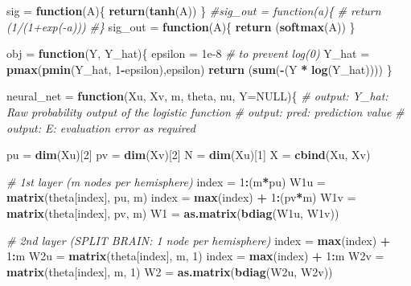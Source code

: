 \documentclass[12pt,halfline,a4paper,]{ouparticle}
\newenvironment{Shaded}{\begin{snugshade}}{\end{snugshade}}
\newcommand{\AttributeTok}[1]{\textcolor[rgb]{0.13,0.29,0.53}{#1}}
\newcommand{\CommentTok}[1]{\textcolor[rgb]{0.56,0.35,0.01}{\textit{#1}}}
\newcommand{\ConstantTok}[1]{\textcolor[rgb]{0.56,0.35,0.01}{#1}}
\newcommand{\ControlFlowTok}[1]{\textcolor[rgb]{0.13,0.29,0.53}{\textbf{#1}}}
\newcommand{\DecValTok}[1]{\textcolor[rgb]{0.00,0.00,0.81}{#1}}
\newcommand{\FloatTok}[1]{\textcolor[rgb]{0.00,0.00,0.81}{#1}}
\newcommand{\FunctionTok}[1]{\textcolor[rgb]{0.13,0.29,0.53}{\textbf{#1}}}
\newcommand{\NormalTok}[1]{#1}
\newcommand{\OtherTok}[1]{\textcolor[rgb]{0.56,0.35,0.01}{#1}}
\newcommand{\SpecialCharTok}[1]{\textcolor[rgb]{0.81,0.36,0.00}{\textbf{#1}}}
\begin{document}
\begin{Shaded}
\begin{Highlighting}[]
\NormalTok{sig }\OtherTok{=} \ControlFlowTok{function}\NormalTok{(A)\{}
  \FunctionTok{return}\NormalTok{(}\FunctionTok{tanh}\NormalTok{(A))}
\NormalTok{\}}
\CommentTok{\#sig\_out = function(a)\{}
\CommentTok{\#  return (1/(1+exp({-}a)))}
\CommentTok{\#\}}
\NormalTok{sig\_out }\OtherTok{=} \ControlFlowTok{function}\NormalTok{(A)\{}
  \FunctionTok{return}\NormalTok{ (}\FunctionTok{softmax}\NormalTok{(A))}
\NormalTok{\}}

\NormalTok{obj }\OtherTok{=} \ControlFlowTok{function}\NormalTok{(Y, Y\_hat)\{}
\NormalTok{  epsilon }\OtherTok{=} \FloatTok{1e{-}8} \CommentTok{\# to prevent log(0)}
\NormalTok{  Y\_hat }\OtherTok{=} \FunctionTok{pmax}\NormalTok{(}\FunctionTok{pmin}\NormalTok{(Y\_hat, }\DecValTok{1}\SpecialCharTok{{-}}\NormalTok{epsilon),epsilon)}
  \FunctionTok{return}\NormalTok{ (}\FunctionTok{sum}\NormalTok{(}\SpecialCharTok{{-}}\NormalTok{(Y }\SpecialCharTok{*} \FunctionTok{log}\NormalTok{(Y\_hat))))}
\NormalTok{\}}

\NormalTok{neural\_net }\OtherTok{=} \ControlFlowTok{function}\NormalTok{(Xu, Xv, m, theta, nu, }\AttributeTok{Y=}\ConstantTok{NULL}\NormalTok{)\{}
  \CommentTok{\# output: Y\_hat: Raw probability output of the logistic function}
  \CommentTok{\# output: pred: prediction value}
  \CommentTok{\# output: E: evaluation error as required}
  
\NormalTok{  pu }\OtherTok{=} \FunctionTok{dim}\NormalTok{(Xu)[}\DecValTok{2}\NormalTok{]}
\NormalTok{  pv }\OtherTok{=} \FunctionTok{dim}\NormalTok{(Xv)[}\DecValTok{2}\NormalTok{]}
\NormalTok{  N }\OtherTok{=} \FunctionTok{dim}\NormalTok{(Xu)[}\DecValTok{1}\NormalTok{]}
\NormalTok{  X }\OtherTok{=} \FunctionTok{cbind}\NormalTok{(Xu, Xv)}
  
  \CommentTok{\# 1st layer (m nodes per hemisphere)}
\NormalTok{  index }\OtherTok{=} \DecValTok{1}\SpecialCharTok{:}\NormalTok{(m}\SpecialCharTok{*}\NormalTok{pu)}
\NormalTok{  W1u }\OtherTok{=} \FunctionTok{matrix}\NormalTok{(theta[index], pu, m)}
\NormalTok{  index }\OtherTok{=} \FunctionTok{max}\NormalTok{(index) }\SpecialCharTok{+} \DecValTok{1}\SpecialCharTok{:}\NormalTok{(pv}\SpecialCharTok{*}\NormalTok{m)}
\NormalTok{  W1v }\OtherTok{=} \FunctionTok{matrix}\NormalTok{(theta[index], pv, m)}
\NormalTok{  W1 }\OtherTok{=} \FunctionTok{as.matrix}\NormalTok{(}\FunctionTok{bdiag}\NormalTok{(W1u, W1v))}
  
  \CommentTok{\# 2nd layer (SPLIT BRAIN: 1 node per hemisphere)}
\NormalTok{  index }\OtherTok{=} \FunctionTok{max}\NormalTok{(index) }\SpecialCharTok{+} \DecValTok{1}\SpecialCharTok{:}\NormalTok{m}
\NormalTok{  W2u }\OtherTok{=} \FunctionTok{matrix}\NormalTok{(theta[index], m, }\DecValTok{1}\NormalTok{)}
\NormalTok{  index }\OtherTok{=} \FunctionTok{max}\NormalTok{(index) }\SpecialCharTok{+} \DecValTok{1}\SpecialCharTok{:}\NormalTok{m}
\NormalTok{  W2v }\OtherTok{=} \FunctionTok{matrix}\NormalTok{(theta[index], m, }\DecValTok{1}\NormalTok{)}
\NormalTok{  W2 }\OtherTok{=} \FunctionTok{as.matrix}\NormalTok{(}\FunctionTok{bdiag}\NormalTok{(W2u, W2v))}
  

\end{Highlighting}
\end{Shaded}
\end{document}
